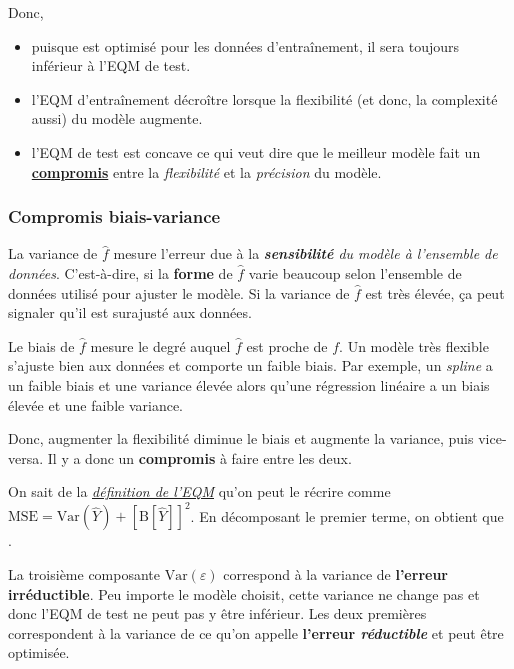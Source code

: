 \documentclass[french]{article}
\begin{document}
\begin{multicols*}{2}
Donc, 
\begin{itemize}
	\item	puisque est optimisé pour les données d'entraînement, il sera toujours inférieur à l'EQM de test.
	\item	l'EQM d'entraînement décroître lorsque la flexibilité (et donc, la complexité aussi) du modèle augmente.
	\item	l'EQM de test est concave ce qui veut dire que le meilleur modèle fait un \textbf{\underline{compromis}} entre la \textit{flexibilité} et la \textit{précision} du modèle.
\end{itemize}

\subsubsection{Compromis biais-variance}
\begin{rappel_enhanced}[Contexte]
La variance de $\hat{f}$ mesure l'erreur due à la \textit{\textbf{sensibilité} du modèle à l'ensemble de données}. C'est-à-dire, si la \textbf{forme} de $\hat{f}$ varie beaucoup selon l'ensemble de données utilisé pour ajuster le modèle. Si la variance de $\hat{f}$ est très élevée, ça peut signaler qu'il est surajusté aux données. 

\bigskip

Le biais de $\hat{f}$ mesure le degré auquel $\hat{f}$ est proche de $f$. Un modèle très flexible s'ajuste bien aux données et comporte un faible biais. Par exemple, un \og \textit{spline} \fg{} a un faible biais et une variance élevée alors qu'une régression linéaire a un biais élevée et une faible variance.

\bigskip

Donc, augmenter la flexibilité diminue le biais et augmente la variance, puis vice-versa. Il y a donc un \textbf{compromis} à faire entre les deux.
\end{rappel_enhanced}

On sait de la \textcolor{bleudefrance}{\textit{\underline{\hyperref[subsubsec:EQMQuality]{\textcolor{bleudefrance}{définition de l'EQM}}}}} qu'on peut le récrire comme $\text{MSE} = \text{Var}(\hat{Y}) + \left[\text{B}[\hat{Y}]\right]^{2}$. En décomposant le premier terme, on obtient que .

\bigskip

La troisième composante $\text{Var}(\varepsilon)$ correspond à la variance de \textbf{l'erreur irréductible}. Peu importe le modèle choisit, cette variance ne change pas et donc l'EQM de test ne peut pas y être inférieur. Les deux premières correspondent à la variance de ce qu'on appelle \textbf{l'erreur \textit{réductible}} et peut être optimisée.


\end{multicols*}
\end{document}
